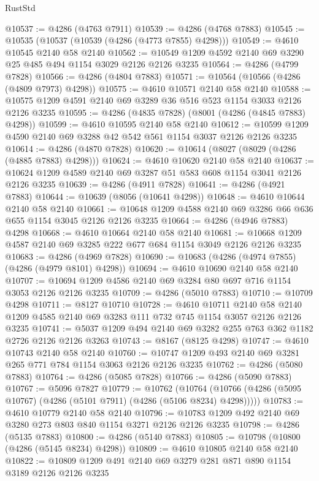 \begin{lexlean}{RustStd}
\begin{coremodule}
{\begin{coremodule}
{{{{{{{{{{{{{{{{@10537 := @4286 (@4763 @7911)
@10539 := @4286 (@4768 @7883)
@10545 := @10535 (@10537 (@10539 (@4286 (@4773 @7855) @4298)))
@10549 := @4610 @10545 @2140 @58 @2140
@10562 := @10549 @1209 @4592 @2140 @69 @3290 @25 @485 @494 @1154 @3029 @2126 @2126 @3235
@10564 := @4286 (@4799 @7828)
@10566 := @4286 (@4804 @7883)
@10571 := @10564 (@10566 (@4286 (@4809 @7973) @4298))
@10575 := @4610 @10571 @2140 @58 @2140
@10588 := @10575 @1209 @4591 @2140 @69 @3289 @36 @516 @523 @1154 @3033 @2126 @2126 @3235
@10595 := @4286 (@4835 @7828) (@8001 (@4286 (@4845 @7883) @4298))
@10599 := @4610 @10595 @2140 @58 @2140
@10612 := @10599 @1209 @4590 @2140 @69 @3288 @42 @542 @561 @1154 @3037 @2126 @2126 @3235
@10614 := @4286 (@4870 @7828)
@10620 := @10614 (@8027 (@8029 (@4286 (@4885 @7883) @4298)))
@10624 := @4610 @10620 @2140 @58 @2140
@10637 := @10624 @1209 @4589 @2140 @69 @3287 @51 @583 @608 @1154 @3041 @2126 @2126 @3235
@10639 := @4286 (@4911 @7828)
@10641 := @4286 (@4921 @7883)
@10644 := @10639 (@8056 (@10641 @4298))
@10648 := @4610 @10644 @2140 @58 @2140
@10661 := @10648 @1209 @4588 @2140 @69 @3286 @66 @636 @655 @1154 @3045 @2126 @2126 @3235
@10664 := @4286 (@4946 @7883) @4298
@10668 := @4610 @10664 @2140 @58 @2140
@10681 := @10668 @1209 @4587 @2140 @69 @3285 @222 @677 @684 @1154 @3049 @2126 @2126 @3235
@10683 := @4286 (@4969 @7828)
@10690 := @10683 (@4286 (@4974 @7855) (@4286 (@4979 @8101) @4298))
@10694 := @4610 @10690 @2140 @58 @2140
@10707 := @10694 @1209 @4586 @2140 @69 @3284 @80 @697 @716 @1154 @3053 @2126 @2126 @3235
@10709 := @4286 (@5010 @7883)
@10710 := @10709 @4298
@10711 := @8127 @10710
@10728 := @4610
    @10711
    @2140
    @58
    @2140
    @1209
    @4585
    @2140
    @69
    @3283
    @111
    @732
    @745
    @1154
    @3057
    @2126
    @2126
    @3235
@10741 := @5037 @1209 @494 @2140 @69 @3282 @255 @763 @362 @1182 @2726 @2126 @2126 @3263
@10743 := @8167 (@8125 @4298)
@10747 := @4610 @10743 @2140 @58 @2140
@10760 := @10747 @1209 @493 @2140 @69 @3281 @265 @771 @784 @1154 @3063 @2126 @2126 @3235
@10762 := @4286 (@5080 @7883)
@10764 := @4286 (@5085 @7828)
@10766 := @4286 (@5090 @7883)
@10767 := @5096 @7827
@10779 := @10762
    (@10764 (@10766 (@4286 (@5095 @10767) (@4286 (@5101 @7911) (@4286 (@5106 @8234) @4298)))))
@10783 := @4610 @10779 @2140 @58 @2140
@10796 := @10783 @1209 @492 @2140 @69 @3280 @273 @803 @840 @1154 @3271 @2126 @2126 @3235
@10798 := @4286 (@5135 @7883)
@10800 := @4286 (@5140 @7883)
@10805 := @10798 (@10800 (@4286 (@5145 @8234) @4298))
@10809 := @4610 @10805 @2140 @58 @2140
@10822 := @10809 @1209 @491 @2140 @69 @3279 @281 @871 @890 @1154 @3189 @2126 @2126 @3235
}}}}}}}}}}}}}}}}
\end{coremodule}}
\end{coremodule}
\end{lexlean}
